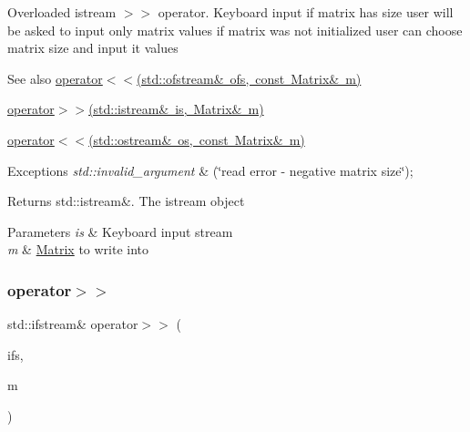 Overloaded istream $>$$>$ operator. Keyboard input if matrix has size user will be asked to input only matrix values if matrix was not initialized user can choose matrix size and input it values \begin{DoxySeeAlso}{See also}
\mbox{\hyperlink{class_matrix_aa574249d63b390cf1108d6e82047ef61}{operator$<$$<$(std\+::ofstream\& ofs, const Matrix\& m)}} 

\mbox{\hyperlink{class_matrix_a3d6c1dcfc038804f4c08687f4f37f48b}{operator$>$$>$(std\+::istream\& is, Matrix\& m)}} 

\mbox{\hyperlink{class_matrix_a060711074cb5bcaf4e75498bc040c4b7}{operator$<$$<$(std\+::ostream\& os, const Matrix\& m)}} 
\end{DoxySeeAlso}

\begin{DoxyExceptions}{Exceptions}
{\em std\+::invalid\+\_\+argument} & (\char`\"{}read error -\/ negative matrix size\char`\"{}); \\
\hline
\end{DoxyExceptions}
\begin{DoxyReturn}{Returns}
std\+::istream\&. The istream object 
\end{DoxyReturn}

\begin{DoxyParams}{Parameters}
{\em is} & Keyboard input stream \\
\hline
{\em m} & \mbox{\hyperlink{class_matrix}{Matrix}} to write into \\
\hline
\end{DoxyParams}
\mbox{\label{class_matrix_aa5699a0bdf0ee014f083ff8a76629d21}} 
\subsubsection{\texorpdfstring{operator$>$$>$}{operator>>}\hspace{0.1cm}{\footnotesize\ttfamily [2/2]}}
{\footnotesize\ttfamily std\+::ifstream\& operator$>$$>$ (\begin{DoxyParamCaption}\item[{std\+::ifstream \&}]{ifs,  }\item[{\mbox{\hyperlink{class_matrix}{Matrix}} \&}]{m }\end{DoxyParamCaption})\hspace{0.3cm}{\ttfamily [friend]}}

